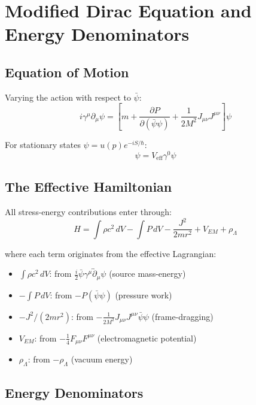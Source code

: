 \documentclass[11pt,a4paper]{article}
\theoremstyle{definition}
\theoremstyle{remark}
\begin{document}
	\section{Modified Dirac Equation and Energy Denominators}
	
	\subsection{Equation of Motion}
	
	Varying the action with respect to $\bar{\psi}$:
	\begin{equation}
		i\gamma^\mu\partial_\mu\psi = \left[m + \frac{\partial P}{\partial(\bar{\psi}\psi)} + \frac{1}{2M^2}J_{\mu\nu}J^{\mu\nu}\right]\psi
	\end{equation}
	
	For stationary states $\psi = u(p)e^{-iS/\hbar}$:
	\begin{equation}
		[\gamma^\mu p_\mu - mc\gamma^0]\psi = V_{\mathrm{eff}}\gamma^0\psi
	\end{equation}
	
	\subsection{The Effective Hamiltonian}
	
	All stress-energy contributions enter through:
	\begin{equation}
		\boxed{H = \int\rho c^2\,dV - \int P\,dV - \frac{J^2}{2mr^2} + V_{EM} + \rho_\Lambda}
		\label{eq:hamiltonian}
	\end{equation}
	
	where each term originates from the effective Lagrangian:
	\begin{itemize}
		\item $\int\rho c^2\,dV$: from $\frac{i}{2}\bar{\psi}\gamma^\mu\overleftrightarrow{\partial}_\mu\psi$ (source mass-energy)
		\item $-\int P\,dV$: from $-P(\bar{\psi}\psi)$ (pressure work)
		\item $-J^2/(2mr^2)$: from $-\frac{1}{2M^2}J_{\mu\nu}J^{\mu\nu}\bar{\psi}\psi$ (frame-dragging)
		\item $V_{EM}$: from $-\frac{1}{4}F_{\mu\nu}F^{\mu\nu}$ (electromagnetic potential)
		\item $\rho_\Lambda$: from $-\rho_\Lambda$ (vacuum energy)
	\end{itemize}
	
	\subsection{Energy Denominators}
	
\end{document}
